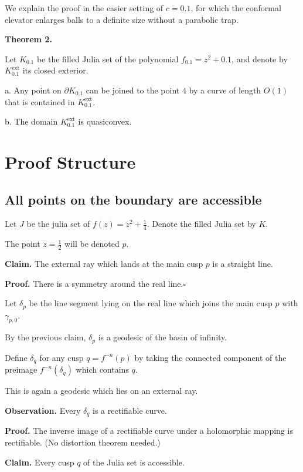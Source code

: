 \documentclass[hebrew,english]{article}
\begin{document}
We explain the proof in the easier setting of $c=0.1$, for which
the conformal elevator enlarges balls to a definite size without a
parabolic \textquotedbl trap\textquotedbl .

\textbf{Theorem 2.}

Let $K_{0.1}$ be the filled Julia set of the polynomial $f_{0.1}=z^{2}+0.1$,
and denote by $K_{0.1}^{\mathrm{ext}}$ its closed exterior.

a. Any point on $\partial K_{0.1}$ can be joined to the point $4$
by a curve of length $O(1)$ that is contained in $K_{0.1}^{\mathrm{ext}}$.

b. The domain $K_{0.1}^{\mathrm{ext}}$ is quasiconvex.

\section{Proof Structure}

\subsection{All points on the boundary are accessible}

Let $J$\textbf{ }be the julia set of $f(z)=z^{2}+\frac{1}{4}$. Denote
the filled Julia set by $K$.

The point $z=\frac{1}{2}$ will be denoted $p$.

\textbf{Claim. }The external ray which lands at the main cusp $p$
is a straight line.

\textbf{Proof. }There is a symmetry around the real line.$\square$

Let $\delta_{p}$ be the line segment lying on the real line which
joins the main cusp $p$ with $\gamma_{p,0}$.

By the previous claim, $\delta_{p}$ is a geodesic of the basin of
infinity.

Define $\delta_{q}$ for any cusp $q=f^{-n}(p)$ by taking the connected
component of the preimage $f^{-n}(\delta_{q})$ which contains $q$. 

This is again a geodesic which lies on an external ray.

\textbf{Observation. }Every $\delta_{q}$ is a rectifiable curve.

\textbf{Proof. }The inverse image of a rectifiable curve under a holomorphic
mapping is rectifiable. (No distortion theorem needed.)

\textbf{Claim. }Every cusp $q$ of the Julia set is accessible.
\end{document}
